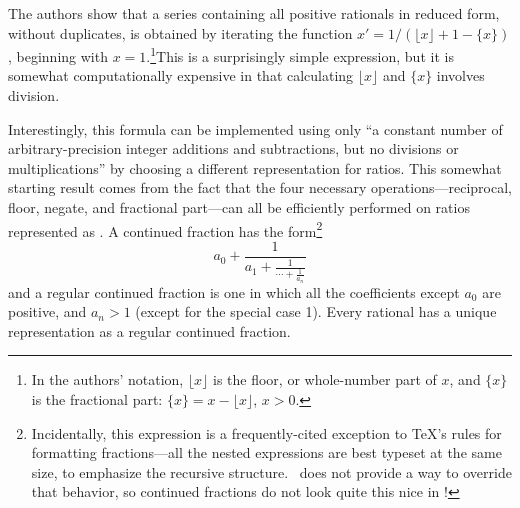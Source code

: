The authors show that a series containing all positive rationals in reduced form, without duplicates, is obtained by iterating the function 
$x' = 1/{(\lfloor x \rfloor + 1 - \{x\})}$, beginning with $x=1$.\footnote{In the authors' notation, $\lfloor x \rfloor$ is the floor, or whole-number part of $x$, and $\{x\}$ is the fractional part: $\{x\} = x - \lfloor x \rfloor$, $x > 0$.}This is a surprisingly simple expression, but it is somewhat computationally expensive in that calculating $\lfloor x \rfloor$ and $\{x\}$ involves division.

Interestingly, this formula can be implemented using only ``a constant number of arbitrary-precision integer additions and subtractions, but no divisions or multiplications'' by choosing a different representation for ratios. This somewhat starting result comes from the fact that the four necessary operations---reciprocal, floor, negate, and fractional part---can all be efficiently performed on ratios represented as . A continued fraction has the form\footnote{Incidentally, this expression is a frequently-cited exception to \TeX's rules for formatting fractions---all the nested expressions are best typeset at the same size, to emphasize the recursive structure. \Meta\ does not provide a way to override that behavior, so continued fractions do not look quite this nice in \Meta!}
$$a_0 + \frac{1}{
    \displaystyle a_1 + \frac{\displaystyle 1}{
        \displaystyle \cdots + \frac{\displaystyle 1}{
            \displaystyle a_n}}}$$
and a regular continued fraction is one in which all the coefficients except $a_0$ are positive, and $a_n > 1$ (except for the special case 1). Every rational has a unique representation as a regular continued fraction.

